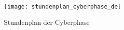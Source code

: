 \thispagestyle{empty}
\vspace{5cm}

\begin{figure}
    \centering
    \texttt{[image: stundenplan\_cyberphase\_de]}
    \caption{Stundenplan der Cyberphase}
\end{figure}

\cleardoublepage
